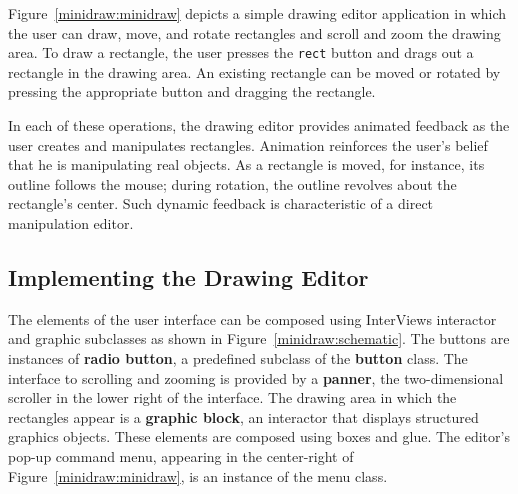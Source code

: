 Figure~\ref{minidraw:minidraw} depicts a simple drawing editor
application in which the user can draw, move, and rotate rectangles
and scroll and zoom the drawing area. To draw a rectangle, the user
presses the {\tt rect} button and drags out a rectangle in the drawing
area.  An existing rectangle can be moved or rotated by pressing the
appropriate button and dragging the rectangle.

\begin{figure*}
\vspace{2.25in}
\vspace{1ex}
\caption{A simple drawing editor application}
\label{minidraw:minidraw}
\end{figure*}

In each of these operations, the drawing editor provides animated
feedback as the user creates and manipulates rectangles.  Animation
reinforces the user's belief that he is manipulating real objects.  As
a rectangle is moved, for instance, its outline follows the mouse;
during rotation, the outline revolves about the rectangle's center.
Such dynamic feedback is characteristic of a direct manipulation
editor.

    \subsection{Implementing the Drawing \newline Editor}

The elements of the user interface can be composed using InterViews
interactor and graphic subclasses as shown in
Figure~\ref{minidraw:schematic}.  The buttons are instances of {\bf radio
button}, a predefined subclass of the {\bf button} class.  The
interface to scrolling and zooming is provided by a {\bf panner},
the two-dimensional scroller in the lower right of the
interface.  The drawing area in which the rectangles appear is a {\bf
graphic block}, an interactor that displays structured graphics
objects.  These elements are composed using boxes and glue.  The
editor's pop-up command menu, appearing in the center-right of
Figure~\ref{minidraw:minidraw}, is an instance of the menu class.

\begin{figure*}
\vspace{2.25in}
\vspace{1ex}
\caption{Drawing editor object structure}
\label{minidraw:schematic}
\end{figure*}

